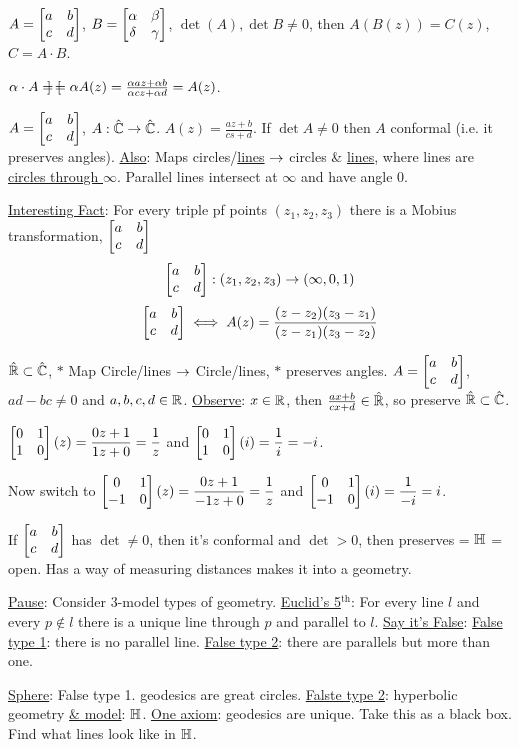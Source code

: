 \documentclass[]{article}
\begin{document}
\begin{example}
	$A = \begin{bmatrix}a & b \\ c & d\end{bmatrix}$, $B = \begin{bmatrix}\alpha & \beta \\ \delta & \gamma\end{bmatrix}$, $\det(A),\det{B}\neq 0$, then $A(B(z)) = C(z)$, $C = A\cdot B$.
\end{example}
$\alpha \cdot A = \begin{bmatrix}\end{bmatrix} = \alpha A(z) = \frac{\alpha a z + \alpha b}{\alpha c z + \alpha d} = A(z)$.

$ A = \begin{bmatrix}a & b \\ c & d\end{bmatrix}$, $A:\hat{\mathbb{C}} \rightarrow \hat{\mathbb{C}}$. $A(z) = \frac{az+b}{cs+d}$. If $\det{A} \neq 0$ then $A$ conformal (i.e. it preserves angles). \ul{Also}: Maps circles/\ul{lines} $\rightarrow$ circles \& \ul{lines}, where lines are \ul{circles through $\infty$}. Parallel lines intersect at $\infty$ and have angle 0.

\ul{Interesting Fact}: For every triple pf points $(z_1,z_2,z_3)$ there is a Mobius transformation, $\begin{bmatrix}a & b \\ c & d\end{bmatrix}$ 
$$ \begin{bmatrix}a&b\\c&d\end{bmatrix}:(z_1,z_2,z_3) \rightarrow (\infty,0,1)$$
$$ \begin{bmatrix}a&b\\c&d\end{bmatrix} \iff A(z) = \frac{(z-z_2)(z_3-z_1)}{(z-z_1)(z_3-z_2)}$$

$\hat{\mathbb{R}} \subset \hat{\mathbb{C}}$, $*$ Map Circle/lines $\rightarrow$ Circle/lines, $*$ preserves angles. $A = \begin{bmatrix}a&b\\c&d\end{bmatrix}$, $ad-bc \neq 0$ and $a,b,c,d\in\mathbb{R}$. \ul{Observe}: $x\in\mathbb{R}$, then $\frac{ax+b}{cx+d} \in\hat{\mathbb{R}}$, so preserve $\hat{\mathbb{R}}\subset \hat{\mathbb{C}}$.

\begin{example}
	$\displaystyle\begin{bmatrix}0&1\\1&0\end{bmatrix}(z) = \frac{0z+1}{1z+0} = \frac{1}{z}$ and $\displaystyle\begin{bmatrix}0&1\\1&0\end{bmatrix}(i) = \frac{1}{i} = -i$. 
	
	Now switch to $\displaystyle\begin{bmatrix}0&1\\-1&0\end{bmatrix}(z) = \frac{0z+1}{-1z+0} = \frac{1}{z}$ and $\displaystyle\begin{bmatrix}0&1\\-1&0\end{bmatrix}(i) = \frac{1}{-i} = i$.
\end{example}
\begin{fact}
	If $\begin{bmatrix}a&b\\c&d\end{bmatrix}$ has $\det \neq 0$, then it's conformal and $\det>0$, then preserves  = $\mathbb{H}$ = open. Has a way of measuring distances makes it into a geometry.
\end{fact}
\ul{Pause}: Consider 3-model types of geometry. \ul{Euclid's 5$^\text{th}$}: For every line $l$ and every $p\notin l$ there is a unique line through $p$ and parallel to $l$. \ul{Say it's False}: \ul{False type 1}: there is no parallel line. \ul{False type 2}: there are parallels but more than one.
\begin{example}
	\ul{Sphere}: False type 1.  geodesics are great circles. \ul{Falste type 2}: hyperbolic geometry \ul{\& model}: $\mathbb{H}$. \ul{One axiom}: geodesics are unique. Take this as a black box. Find what lines look like in $\mathbb{H}$.
\end{example}
\end{document}
